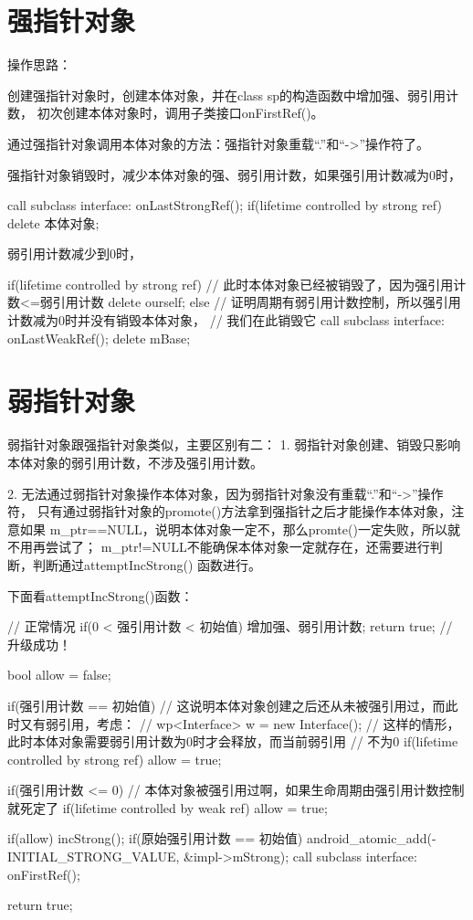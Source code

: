 \documentclass[a4paper,11pt]{article}
\begin{document}
\section[强指针对象]{强指针对象}
操作思路：

创建强指针对象时，创建本体对象，并在class sp的构造函数中增加强、弱引用计数，
初次创建本体对象时，调用子类接口onFirstRef()。

通过强指针对象调用本体对象的方法：强指针对象重载“.”和“->”操作符了。

强指针对象销毁时，减少本体对象的强、弱引用计数，如果强引用计数减为0时，

\begin{cppcode}
call subclass interface: onLastStrongRef();
if(lifetime controlled by strong ref) {
  delete 本体对象;
}
\end{cppcode}

弱引用计数减少到0时，

\begin{cppcode}
if(lifetime controlled by strong ref) {
  // 此时本体对象已经被销毁了，因为强引用计数<=弱引用计数
  delete ourself;
} else {
  // 证明周期有弱引用计数控制，所以强引用计数减为0时并没有销毁本体对象，
  // 我们在此销毁它
  call subclass interface: onLastWeakRef();
  delete mBase;
}
\end{cppcode}

\section[弱指针对象]{弱指针对象}
弱指针对象跟强指针对象类似，主要区别有二：
1. 弱指针对象创建、销毁只影响本体对象的弱引用计数，不涉及强引用计数。

2. 无法通过弱指针对象操作本体对象，因为弱指针对象没有重载“.”和“->”操作符，
只有通过弱指针对象的promote()方法拿到强指针之后才能操作本体对象，注意如果
m\_ptr==NULL，说明本体对象一定不，那么promte()一定失败，所以就不用再尝试了；
m\_ptr!=NULL不能确保本体对象一定就存在，还需要进行判断，判断通过attemptIncStrong()
函数进行。

下面看attemptIncStrong()函数：

\begin{cppcode}
// 正常情况
if(0 < 强引用计数 < 初始值) {
  增加强、弱引用计数;
  return true; // 升级成功！
}

bool allow = false;

if(强引用计数 == 初始值) {
  // 这说明本体对象创建之后还从未被强引用过，而此时又有弱引用，考虑：
  // wp<Interface> w = new Interface();
  // 这样的情形，此时本体对象需要弱引用计数为0时才会释放，而当前弱引用
  // 不为0
  if(lifetime controlled by strong ref)
    allow = true;
}

if(强引用计数 <= 0) {
  // 本体对象被强引用过啊，如果生命周期由强引用计数控制就死定了
  if(lifetime controlled by weak ref)
    allow = true;
}

if(allow)
  incStrong();
if(原始强引用计数 == 初始值) {
  android_atomic_add(-INITIAL_STRONG_VALUE, &impl->mStrong);
  call subclass interface: onFirstRef();
}

return true;
\end{cppcode}
\end{document}
